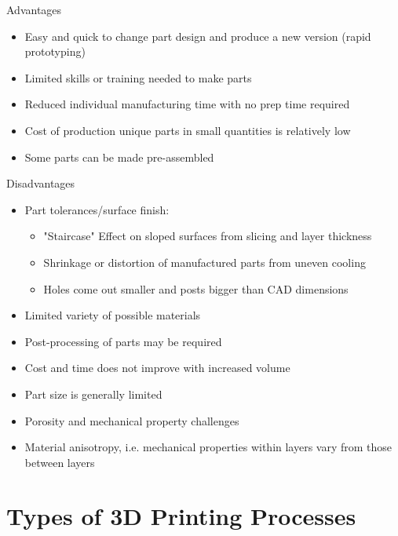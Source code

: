 \documentclass{article}
\begin{document}
Advantages
\begin{itemize}
    \item Easy and quick to change part design and produce a new version (rapid prototyping)
    \item Limited skills or training needed to make parts
    \item Reduced individual manufacturing time with no prep time required
    \item Cost of production unique parts in small quantities is relatively low
    \item Some parts can be made pre-assembled
\end{itemize}
Disadvantages
\begin{itemize}
    \item Part tolerances/surface finish:
        \begin{itemize}
            \item "Staircase" Effect on sloped surfaces from slicing and layer thickness
            \item Shrinkage or distortion of manufactured parts from uneven cooling
            \item Holes come out smaller and posts bigger than CAD dimensions
        \end{itemize}
    \item Limited variety of possible materials
    \item Post-processing of parts may be required
    \item Cost and time does not improve with increased volume
    \item Part size is generally limited
    \item Porosity and mechanical property challenges
    \item Material anisotropy, i.e. mechanical properties within layers vary from those between layers
\end{itemize}

\section{Types of 3D Printing Processes}
\end{document}
